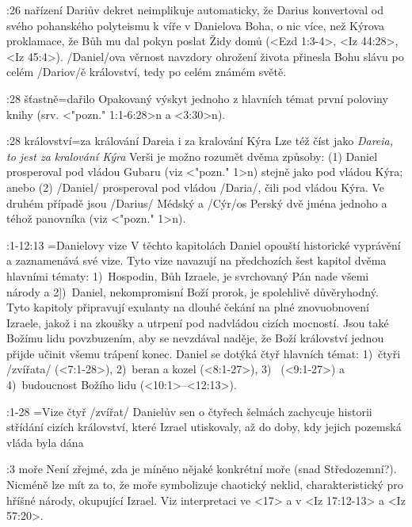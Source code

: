 :26 {nařízení} 
     Dariův dekret neimplikuje automaticky, že Darius konvertoval od svého
     pohanského polyteismu k víře v Danielova Boha, o nic více, než Kýrova proklamace, že Bůh mu dal pokyn poslat Židy domů (<Ezd 1:3-4>, <Iz 44:28>, <Iz 45:4>).
     \x/Daniel/ova věrnost navzdory ohrožení života přinesla Bohu slávu po celém \x/Dariov/ě království, tedy po celém známém světě.  

:28 {šťastně}={dařilo} Opakovaný výskyt jednoho z hlavních témat první poloviny knihy  (srv. <"pozn." 1:1-6:28>n a <3:30>n).     

:28 {království}={za králování Dareia i za kralování Kýra} Lze též  číst jako {\em Dareia, to jest za kralování Kýra}     Verši je možno rozumět dvěma způsoby: (1) Daniel prosperoval pod vládou Gubaru  (viz <"pozn." 1>n) stejně jako pod vládou Kýra; anebo (2) \x/Daniel/ prosperoval pod vládou \x/Daria/, čili pod vládou Kýra. Ve druhém případě jsou  \x/Darius/ Médský a \x/Cýr/os Perský dvě jména jednoho a téhož panovníka  (viz <"pozn." 1>n).



:1-12:13 {}={Danielovy vize} 
     V těchto kapitolách Daniel opouští historické vyprávění
     a zaznamenává své vize. Tyto vize navazují na předchozích šest kapitol dvěma hlavními tématy: 
     1)~Hospodin, Bůh Izraele, je svrchovaný Pán nade všemi národy a 
     2])~Daniel, nekompromisní Boží prorok, je spolehlivě důvěryhodný. Tyto kapitoly připravují exulanty na dlouhé čekání na plné znovuobnovení Izraele, jakož i na zkoušky a utrpení pod
        nadvládou cizích mocností. Jsou také Božímu lidu povzbuzením, aby se nevzdával naděje,
        že Boží království jednou přijde učinit všemu trápení konec. Daniel se dotýká čtyř
        hlavních témat: 1)~čtyři \x/zvířata/ (<7:1-28>),  
                        2)~beran a kozel (<8:1-27>),
                        3)~ (<9:1-27>) a 
                        4)~budoucnost Božího lidu (<10:1>--<12:13>).   

:1-28 {}={Vize čtyř \x/zvířat/}
     Danielův sen o čtyřech šelmách zachycuje historii střídání cizích
     království, které Izrael utiskovaly, až do doby, kdy jejich pozemská vláda byla dána 

:3 {moře} 
     Není zřejmé, zda je míněno nějaké konkrétní moře (snad Středozemní?). Nicméně
     lze mít za to, že moře symbolizuje chaotický neklid, charakteristický pro hříšné národy,
     okupující Izrael. Viz interpretaci ve  <17> a v <Iz 17:12-13> a <Iz 57:20>. 

